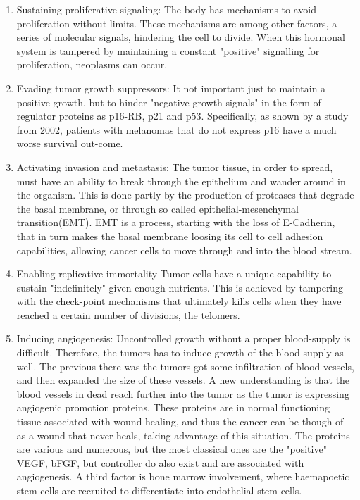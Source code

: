 \documentclass[12p]{article}
\begin{document}
\begin{enumerate}
  \item
    Sustaining proliferative signaling:
    The body has mechanisms to avoid proliferation without limits.
    These mechanisms are among other factors, a series of molecular signals, hindering the cell to divide.
    When this hormonal system is tampered by maintaining a constant "positive" signalling for proliferation, neoplasms can occur.
  \item
    Evading tumor growth suppressors:
    It not important just to maintain a positive growth, but to hinder "negative growth signals" in the form of regulator proteins as p16-RB, p21 and p53.
    Specifically, as shown by a study from 2002, patients with melanomas that do not express p16 have a much worse survival out-come.
  \item
    Activating invasion and metastasis:
    The tumor tissue, in order to spread, must have an ability to break through the epithelium and wander around in the organism.
    This is done partly by the production of proteases that degrade the basal membrane, or through so called epithelial-mesenchymal transition(EMT).
    EMT is a process, starting with the loss of E-Cadherin, that in turn makes the basal membrane loosing its cell to cell adhesion capabilities, allowing cancer cells to move through and into the blood stream.
  \item
    Enabling replicative immortality
    Tumor cells have a unique capability to sustain "indefinitely" given enough nutrients.
    This is achieved by tampering with the check-point mechanisms that ultimately kills cells when they have reached a certain number of divisions, the telomers.
  \item
    Inducing angiogenesis:
    Uncontrolled growth without a proper blood-supply is difficult.
    Therefore, the tumors has to induce growth of the blood-supply as well.
    The previous there was the tumors got some infiltration of blood vessels, and then expanded the size of these vessels.
    A new understanding is that the blood vessels in dead reach further into the tumor as the tumor is expressing angiogenic promotion proteins.
    These proteins are in normal functioning tissue associated with wound healing, and thus the cancer can be though of as a wound that never heals, taking advantage of this situation.
    The proteins are various and numerous, but the most classical ones are the "positive" VEGF, bFGF, but controller do also exist and are associated with angiogenesis.
    A third factor is bone marrow involvement, where haemapoetic stem cells are recruited to differentiate into endothelial stem cells.

\end{enumerate}
\end{document}
